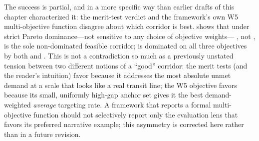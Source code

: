 The success is partial, and in a more specific way than earlier drafts of this chapter
characterized it: the merit-test verdict and the framework's own W5 multi-objective
function disagree about which corridor is best.  shows that under
strict Pareto dominance---not sensitive to any choice of objective weights---
, not , is the sole non-dominated feasible corridor;
 is dominated on all three objectives by both  and
. This is not a contradiction so much as a previously unstated tension
between two different notions of a ``good'' corridor: the merit tests (and the reader's
intuition) favor  because it addresses the most absolute unmet demand at a
scale that looks like a real transit line; the W5 objective favors  because
its small, uniformly high-gap anchor set gives it the best demand-weighted \emph{average}
targeting rate. A framework that reports a formal multi-objective function should not
selectively report only the evaluation lens that favors its preferred narrative example;
this asymmetry is corrected here rather than in a future revision.


